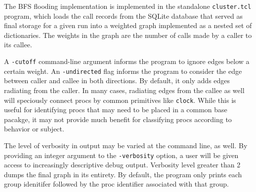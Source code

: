 \documentclass{article}[letter,10pt]
\begin{document}
{{    The BFS flooding implementation is implemented in the standalone \texttt{cluster.tcl} program, which loads
    the call records from the SQLite database that served as final storage for a given run into a weighted graph
    implemented as a nested set of dictionaries. The weights in the graph are the number of calls made by a caller
    to its callee.

    A \texttt{-cutoff} command-line argument informs the program to ignore edges below a certain weight.
    An \texttt{-undirected} flag informs the program to consider the edge between caller and callee in both
    directions. By default, it only adds edges radiating from the caller. In many cases, radiating edges from
    the callee as well will speciously connect procs by common primitives like \texttt{clock}. While this is useful
    for identifying procs that may need to be placed in a common base pacakge, it may not provide much benefit
    for classifying procs according to behavior or subject.

    The level of verbosity in output may be varied at the command line, as well. By providing an integer argument
    to the \texttt{-verbosity} option, a user will be given access to increasingly descriptive debug output.
    Verbosity level greater than 2 dumps the final graph in its entirety. By default, the program only prints
    each group idenitifer followed by the proc identifier associated with that group.
  }
}
\end{document}

